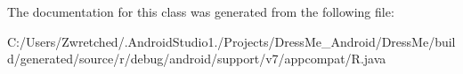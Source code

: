 The documentation for this class was generated from the following file\+:\begin{DoxyCompactItemize}
\item 
C\+:/\+Users/\+Zwretched/.\+Android\+Studio1./\+Projects/\+Dress\+Me\+\_\+\+Android/\+Dress\+Me/build/generated/source/r/debug/android/support/v7/appcompat/R.\+java\end{DoxyCompactItemize}
